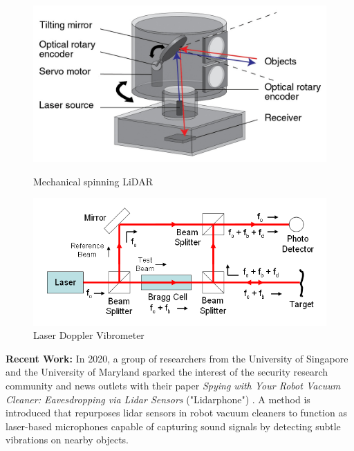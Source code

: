 \documentclass[sigconf, nonacm]{acmart}
\begin{document}
\begin{figure}[H]
  \centering
  \includegraphics[width=\linewidth]{embed/Lidar_scanner.jpg}
  \caption{Mechanical spinning LiDAR \cite{RenishawLidar}}
  \label{fig:LiDAR}

  \vspace{0.5cm}

  \includegraphics[width=\linewidth]{embed/Laser_Doppler_Vibrometer.png}
  \caption{Laser Doppler Vibrometer \cite{WikipediaLDV}}
  \label{fig:LDV}
\end{figure}

\textbf{Recent Work:} In 2020, a group of researchers from the University of Singapore and the University of Maryland sparked the interest of the security research community \cite{BitdefenderRobotVacuumEavesdrop} and news outlets \cite{ForbesRobotVacuumEavesdrop} with their paper \textit{Spying with Your Robot Vacuum Cleaner: Eavesdropping via Lidar Sensors} ("Lidarphone") \cite{Lidarphone2020}. A method is introduced that repurposes lidar sensors in robot vacuum cleaners to function as laser-based microphones capable of capturing sound signals by detecting subtle vibrations on nearby objects.
\end{document}
